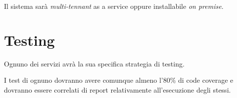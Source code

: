 Il sistema sarà \emph{multi-tennant} as a service oppure installabile
\emph{on premise}.

\hypertarget{testing}{%
\section{Testing}\label{testing}}

Ognuno dei servizi avrà la sua specifica strategia di testing.

I test di ognuno dovranno avere comunque almeno l'80\% di code coverage
e dovranno essere correlati di report relativamente all'esecuzione degli
stessi.
